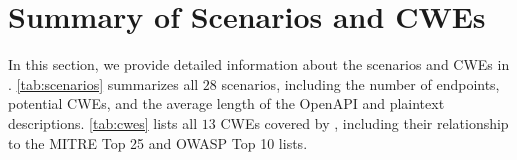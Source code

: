 \section{Summary of \benchmark{} Scenarios and CWEs}
\label{appendix:infotables}
In this section, we provide detailed information about the scenarios and CWEs in \benchmark{}.
\cref{tab:scenarios} summarizes all $28$ scenarios, including the number of endpoints, potential CWEs, and the average length of the OpenAPI and plaintext descriptions.
\cref{tab:cwes} lists all $13$ CWEs covered by \benchmark{}, including their relationship to the MITRE Top 25 and OWASP Top 10 lists.



